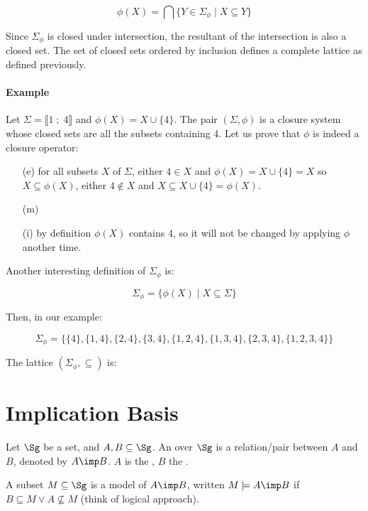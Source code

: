 	\[ \phi(X) = \bigcap \{Y \in \Sigma_\phi \; | \; X \subseteq Y \} \]

\noindent Since $\Sigma_{\phi}$ is closed under intersection, the resultant of
the intersection is also a closed set. The set of closed sets ordered by 
inclusion defines a complete lattice as defined previously. 


\paragraph{Example} Let $\Sigma = \llbracket 1 \; ; \; 4 \rrbracket$ and 
$\phi(X) = X \cup \{4 \}$. The pair $(\Sigma, \phi)$ is a closure system whose
closed sets are all the subsets containing 4. Let us prove that $\phi$ is indeed
a closure operator:
\begin{itemize}
	\item[(e)] for all subsets $X$ of $\Sigma$, either $4 \in X$ and 
	$\phi(X) = X \cup \{4 \} = X$ so $X \subseteq \phi(X)$, either $4 \notin X$
	and $X \subseteq X \cup \{4 \} = \phi(X)$.
	\item[(m)]
	\item[(i)] by definition $\phi(X)$ contains 4, so it will not be
	changed by applying $\phi$ another time.
\end{itemize}

\noindent Another interesting definition of $\Sigma_{\phi}$ is:

	\[ \Sigma_{\phi} = \{ \phi(X) \; | \; X \subseteq \Sigma \} \]

\noindent Then, in our example:

	\[ \Sigma_{\phi} = \{ \{ 4\}, \{ 1, 4\}, \{ 2, 4\},
		\{ 3, 4\}, \{ 1, 2, 4\}, \{ 1, 3, 4\},\{ 2, 3, 4\}, 
		\{ 1, 2, 3, 4\} \}
	\]
	
\noindent The lattice $(\Sigma_{\phi}, \subseteq)$ is:



	 
\section{Implication Basis}

\begin{definition} Let $\Sg$ be a set, and $A, B 
\subseteq 
\Sg$. An  over $\Sg$ is a relation/pair between $A$ and 
$B$, denoted by $A \imp B$. $A$ is the , $B$ the 
. 	
\end{definition}

\begin{definition} A subset $M \subseteq 
\Sg$ is a model of $A \imp B$, written $M \models A 
\imp B$ if $B \subseteq M \lor A \nsubseteq M$ (think of logical 
approach).
\end{definition}

